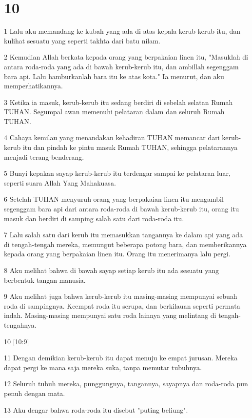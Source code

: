 \chapter{10}

\par 1 Lalu aku memandang ke kubah yang ada di atas kepala kerub-kerub itu, dan kulihat sesuatu yang seperti takhta dari batu nilam.
\par 2 Kemudian Allah berkata kepada orang yang berpakaian linen itu, "Masuklah di antara roda-roda yang ada di bawah kerub-kerub itu, dan ambillah segenggam bara api. Lalu hamburkanlah bara itu ke atas kota." Ia menurut, dan aku memperhatikannya.
\par 3 Ketika ia masuk, kerub-kerub itu sedang berdiri di sebelah selatan Rumah TUHAN. Segumpal awan memenuhi pelataran dalam dan seluruh Rumah TUHAN.
\par 4 Cahaya kemilau yang menandakan kehadiran TUHAN memancar dari kerub-kerub itu dan pindah ke pintu masuk Rumah TUHAN, sehingga pelatarannya menjadi terang-benderang.
\par 5 Bunyi kepakan sayap kerub-kerub itu terdengar sampai ke pelataran luar, seperti suara Allah Yang Mahakuasa.
\par 6 Setelah TUHAN menyuruh orang yang berpakaian linen itu mengambil segenggam bara api dari antara roda-roda di bawah kerub-kerub itu, orang itu masuk dan berdiri di samping salah satu dari roda-roda itu.
\par 7 Lalu salah satu dari kerub itu memasukkan tangannya ke dalam api yang ada di tengah-tengah mereka, memungut beberapa potong bara, dan memberikannya kepada orang yang berpakaian linen itu. Orang itu menerimanya lalu pergi.
\par 8 Aku melihat bahwa di bawah sayap setiap kerub itu ada sesuatu yang berbentuk tangan manusia.
\par 9 Aku melihat juga bahwa kerub-kerub itu masing-masing mempunyai sebuah roda di sampingnya. Keempat roda itu serupa, dan berkilauan seperti permata indah. Masing-masing mempunyai satu roda lainnya yang melintang di tengah-tengahnya.
\par 10 [10:9]
\par 11 Dengan demikian kerub-kerub itu dapat menuju ke empat jurusan. Mereka dapat pergi ke mana saja mereka suka, tanpa memutar tubuhnya.
\par 12 Seluruh tubuh mereka, punggungnya, tangannya, sayapnya dan roda-roda pun penuh dengan mata.
\par 13 Aku dengar bahwa roda-roda itu disebut "puting beliung".
